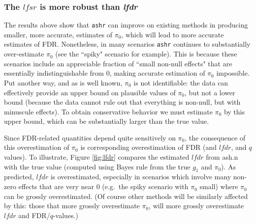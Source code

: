 \documentclass[11pt]{article}
\def\lfdr{\textit{lfdr}}
\def\lfsr{\textit{lfsr}}
\def\ashr{{\tt ashr}\xspace}
\begin{document}
%
%


\subsubsection*{The $\lfsr$ is more robust than \lfdr}

The results above show that \ashr can improve on existing methods in producing smaller, more accurate, 
estimates of $\pi_0$, which will lead to more accurate estimates of FDR.
Nonetheless, in many scenarios \ashr continues
to substantially over-estimate $\pi_0$ (see the ``spiky" scenario for example). 
This is because these scenarios include 
an appreciable fraction of ``small non-null effects" that are essentially indistinguishable from 0, making accurate
estimation of $\pi_0$ impossible. Put another way, and as is well known, $\pi_0$ is not identifiable:
 the data can effectively provide an upper bound on plausible values of $\pi_0$,
but not a lower bound (because the data cannot rule out that everything is non-null, but with minuscule effects).
To obtain conservative behavior we must estimate $\pi_0$ by this upper bound, which can
be substantially larger than the true value. 

Since FDR-related quantities depend quite sensitively on $\pi_0$, the consequence of this 
overestimation of $\pi_0$ is corresponding overestimation of FDR (and $\lfdr$, and $q$ values).
To illustrate, Figure \ref{fig:lfdr} compares the estimated $\lfdr$ from ash.n with the true value (computed using
Bayes rule from the true $g_1$ and $\pi_0$). As predicted, $\lfdr$ is overestimated, especially in scenarios which involve many
non-zero effects that are very near 0 (e.g.~the spiky scenario with $\pi_0$ small) where
$\pi_0$ can be grossly overestimated.  
(Of course other methods will be similarly affected by this: those that more grossly overestimate $\pi_0$, will more grossly overestimate $\lfdr$ and FDR/$q$-values.)
\end{document}
